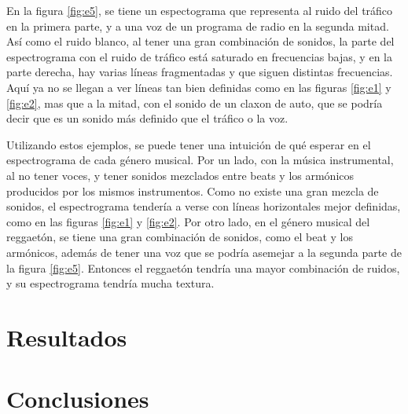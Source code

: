 \documentclass[12pt, letterpaper]{article}
\begin{document}
\noindent En la figura \ref{fig:e5}, se tiene un espectograma que representa al
ruido del tráfico en la primera parte, y a una voz de un programa de radio en la segunda
mitad. Así como el ruido blanco, al tener una gran combinación de sonidos, la
parte del espectrograma con el ruido de tráfico está saturado en frecuencias bajas,
y en la parte derecha, hay varias líneas fragmentadas y que siguen distintas frecuencias.
Aquí ya no se llegan a ver líneas tan bien definidas como en las figuras
\ref{fig:e1} y \ref{fig:e2}, mas que a la mitad, con el
sonido de un claxon de auto, que se podría decir que es un sonido más definido
que el tráfico o la voz. \medskip

\noindent Utilizando estos ejemplos, se puede tener una intuición de qué esperar
en el espectrograma de cada género musical. Por un lado, con la música instrumental,
al no tener voces, y tener sonidos mezclados entre beats y los armónicos producidos
por los mismos instrumentos. Como no existe una gran mezcla de sonidos, el espectrograma
tendería a verse con líneas horizontales mejor definidas, como en las figuras
\ref{fig:e1} y \ref{fig:e2}. Por otro lado, en el género musical del reggaetón, se tiene
una gran combinación de sonidos, como el beat y los armónicos, además de tener una voz
que se podría asemejar a la segunda parte de la figura \ref{fig:e5}. Entonces el reggaetón
tendría una mayor combinación de ruidos, y su espectrograma tendría mucha textura.

\section{Resultados}

\section{Conclusiones}
\end{document}
